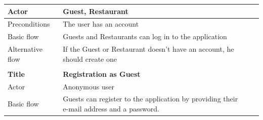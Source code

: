 \begin{table}[ht]
\begin{tabular}{ | l | l |}
		Actor &  Guest, Restaurant \\ \hline
		Preconditions &  The user has an account \\ \hline
		Basic flow & Guests and Restaurants can log in to the application \\ \hline
		Alternative flow & If the Guest or Restaurant doesn't have an account, he should create one \\
		\hline	
		& \\
		\hline
		\textbf{Title} & \textbf{Registration as Guest} \\ \hline
		Actor &  Anonymous user \\ \hline
		Basic flow & \makecell[l]{ Guests can register to the application by providing their \\ e-mail address and a password.} \\ 
		\hline		
	\end{tabular}
	\label{tab:TabularExample}	
\end{table}		
